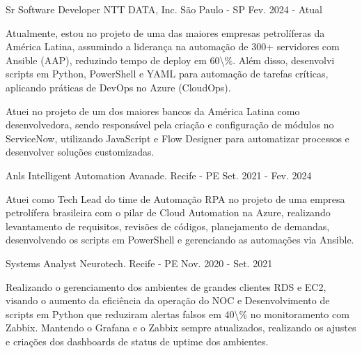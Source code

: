 

\begin{cventries}

  \cventry
    {Sr Software Developer} %
    {NTT DATA, Inc.} %
    {São Paulo - SP} %
    {Fev. 2024 - Atual} %
    {
      \begin{cvitems} %
        \item {Atualmente, estou no projeto de uma das maiores empresas petrolíferas da América Latina, assumindo a liderança na automação de 300+ servidores com Ansible (AAP), reduzindo tempo de deploy em 60\textbackslash{}\%. Além disso, desenvolvi scripts em Python, PowerShell e YAML para automação de tarefas críticas, aplicando práticas de DevOps no Azure (CloudOps).}
        \item {Atuei no projeto de um dos maiores bancos da América Latina como desenvolvedora, sendo responsável pela criação e configuração de módulos no ServiceNow, utilizando JavaScript e Flow Designer para automatizar processos e desenvolver soluções customizadas.}
      \end{cvitems}
    }

  \cventry
    {Anls Intelligent Automation} %
    {Avanade.} %
    {Recife - PE} %
    {Set. 2021 - Fev. 2024} %
    {
      \begin{cvitems} %
        \item {Atuei como Tech Lead do time de Automação RPA no projeto de uma empresa petrolífera brasileira com o pilar de Cloud Automation na Azure, realizando levantamento de requisitos, revisões de códigos, planejamento de demandas, desenvolvendo os scripts em PowerShell e gerenciando as automações via Ansible. }
      \end{cvitems}
    }

  \cventry
    {Systems Analyst} %
    {Neurotech.} %
    {Recife - PE} %
    {Nov. 2020 - Set. 2021} %
    {
      \begin{cvitems} %
        \item {Realizando o gerenciamento dos ambientes de grandes clientes RDS e EC2, visando o aumento da eficiência da operação do NOC e Desenvolvimento de scripts em Python que reduziram alertas falsos em 40\textbackslash{}\% no monitoramento com Zabbix. Mantendo o Grafana e o Zabbix sempre atualizados, realizando os ajustes e criações dos dashboards de status de uptime dos ambientes.}
      \end{cvitems}
    }

\end{cventries}
